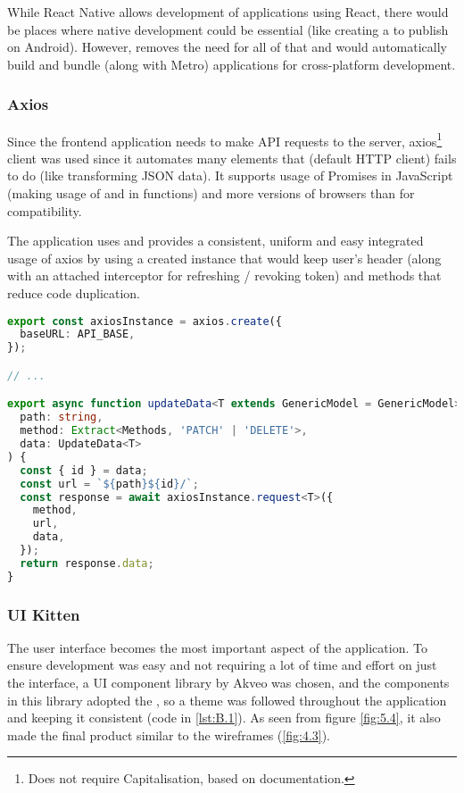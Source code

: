 \documentclass[../main.tex]{subfiles}
\begin{document}
While React Native allows development of applications using React, there would be places where native development could be essential (like creating a  to publish on Android). However,  removes the need for all of that and would automatically build and bundle (along with Metro) applications for cross-platform development.

\subsubsection{Axios}

Since the frontend application needs to make API requests to the server, axios\footnote{Does not require Capitalisation, based on documentation.} client was used since it automates many elements that  (default HTTP client) fails to do (like transforming JSON data). It supports usage of Promises in JavaScript (making usage of  and  in functions) and more versions of browsers than  for compatibility.

The application uses and provides a consistent, uniform and easy integrated usage of axios by using a created instance that would keep user's  header (along with an attached interceptor for refreshing / revoking token) and methods that reduce code duplication.

\begin{lstlisting}[language=typescript, caption={Creation and usage of axios instance in \citecode{SrcAppApi}}]
export const axiosInstance = axios.create({
  baseURL: API_BASE,
});

// ...

export async function updateData<T extends GenericModel = GenericModel>(
  path: string,
  method: Extract<Methods, 'PATCH' | 'DELETE'>,
  data: UpdateData<T>
) {
  const { id } = data;
  const url = `${path}${id}/`;
  const response = await axiosInstance.request<T>({
    method,
    url,
    data,
  });
  return response.data;
}
\end{lstlisting}

\subsubsection{UI Kitten}

The user interface becomes the most important aspect of the application. To ensure development was easy and not requiring a lot of time and effort on just the interface, a UI component library by Akveo was chosen, and the components in this library adopted the , so a theme was followed throughout the application and keeping it consistent (code in \ref{lst:B.1}). As seen from figure \ref{fig:5.4}, it also made the final product similar to the wireframes (\ref{fig:4.3}).
\end{document}
